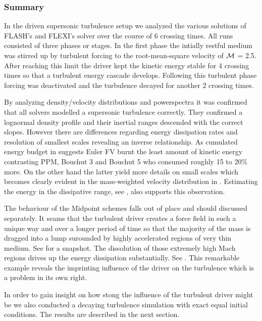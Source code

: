 \subsubsection{Summary}
In the driven supersonic turbulence setup we analyzed the various solutions of
FLASH's and FLEXI's solver over the course of 6 crossing times. All runs
consisted of three phases or stages. In the first phase the intially restful
medium was stirred up by turbulent forcing to the root-mean-square velocity
of $\mathcal{M}$ = 2.5. After reaching this limit the driver kept the kinetic
energy stable for 4 crossing times so that a turbulent energy cascade develops. 
Following this turbulent phase forcing was deactivated and the turbulence
decayed for another 2 crossing times.

By analyzing density/velocity distributions and powerspectra it was confirmed
that all solvers modelled a supersonic turbulence correctly. They confirmed a
lognormal density profile and their inertial ranges descended with the correct
slopes. However there are differences regarding energy dissipation rates and
resolution of smallest scales revealing an inverse relationship. As cumulated
energy budget in 
suggests Euler FV burnt the least amount of kinetic energy contrasting PPM,
Bouchut 3 and Bouchut 5 who consumed roughly 15 to 20\% more.  On the other
hand the latter yield more details on small scales which becomes clearly
evident in the mass-weighted velocity distribution in
. Estimating the energy in the
dissipative range, see , also supports this observation.

The behaviour of the Midpoint schemes falls out of place and should discussed
separately. It seams that the turbulent driver creates a force field in such a
unique way and over a longer period of time so that the majority of the mass is
dragged into a lump surounded by highly accelerated regions of very thin
medium. See  for a snapshot.
The dissolution of those extremely high Mach regions drives up the energy
dissipation substantially. See
.  This remarkable example
reveals the imprinting influence of the driver on the turbulence which is
a problem in its own right.

In order to gain insight on how stong the influence of the turbulent driver
might be we also conducted a decaying turbulence simulation with exact equal
initial conditions. The results are described in the next section.
